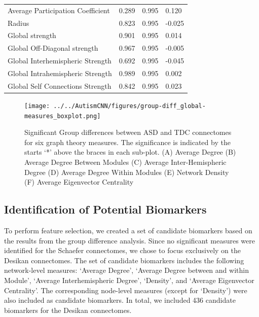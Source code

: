 \documentclass[11pt,conference]{IEEEtran}
\begin{document}
\begin{table}
\begin{center}
\begin{tabular}{p{4cm}p{1cm}p{1cm}p{1cm}}
                    Average Participation Coefficient &    0.289 &             0.995 &        0.120 \\
                                                Radius &    0.823 &             0.995 &       -0.025 \\
                                    Global strength &    0.901 &             0.995 &        0.014 \\
                        Global Off-Diagonal strength &    0.967 &             0.995 &       -0.005 \\
                    Global Interhemispheric Strength &    0.692 &             0.995 &       -0.045 \\
                    Global Intrahemispheric Strength &    0.989 &             0.995 &        0.002 \\
                    Global Self Connections Strength &    0.842 &             0.995 &        0.023 \\
                \bottomrule
            \end{tabular}                                                      
            \label{group-diff-schaefer}
        \end{center}
    \end{table}

    \begin{figure}
        \vskip 0.2in
        \begin{center}
            \centerline{\texttt{[image: ../../AutismCNN/figures/group-diff\_global-measures\_boxplot.png]}}
            \caption{
                Significant Group differences between ASD and TDC connectomes for six graph
                theory measures. The significance is indicated by the starts `*' above the
                braces in each sub-plot. (A) Average Degree (B) Average Degree Between Modules
                (C) Average Inter-Hemispheric Degree (D) Average Degree Within Modules
                (E) Network Density (F) Average Eigenvector Centrality
            }
            \label{group-diff-boxplots}
        \end{center}
        \vskip -0.2in
    \end{figure}

\subsection*{\textbf{Identification of Potential Biomarkers}}

    To perform feature selection, we created a set of candidate biomarkers based on the 
    results from the group difference analysis. Since no significant measures were 
    identified for the Schaefer connectomes, we chose to focus exclusively on the Desikan
    connectomes. The set of candidate biomarkers includes the following network-level 
    measures: `Average Degree', `Average Degree between and within Module', 
    `Average Interhemispheric Degree',  `Density', and `Average Eigenvector Centrality'.
    The corresponding node-level measures (except for `Density') were also included as 
    candidate biomarkers. In total, we included 436 candidate biomarkers for the Desikan 
    connectomes.
\end{document}
